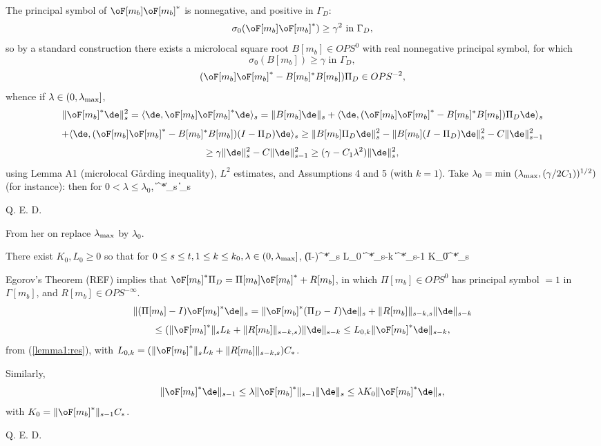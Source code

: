 The principal symbol of $\oF[m_b]\oF[m_b]^*$ is nonnegative, and positive in $\Gamma_D$:
\[
\sigma_0(\oF[m_b]\oF[m_b]^*) \ge \gamma^2 \mbox{ in } \Gamma_D,
\]
so by a standard construction there exists a microlocal square root $B[m_b] \in OPS^0$ with real nonnegative principal symbol, for which 
\[
\sigma_0(B[m_b]) \ge \gamma \mbox{ in } \Gamma_D,
\]
\[
(\oF[m_b]\oF[m_b]^*-B[m_b]^*B[m_b]) \Pi_D \in OPS^{-2},
\]
whence if $\lambda \in (0,\lambda_{\rm max}]$,
\[
\|\oF[m_b]^*\de\|^2_s = \langle \de, \oF[m_b]\oF[m_b]^* \de \rangle_s =
\|B[m_b]\de\|_s+ \langle \de,(\oF[m_b]\oF[m_b]^*-B[m_b]^*B[m_b]) \Pi_D\de
\rangle_s
\]
\[
+ \langle \de,(\oF[m_b]\oF[m_b]^*-B[m_b]^*B[m_b]) (I-\Pi_D)\de \rangle_s \ge
\|B[m_b]\Pi_D\de\|^2_s  -\|B[m_b](I-\Pi_D)\de\|^2_s  - C\|\de\|^2_{s-1}
\]
\[
\ge \gamma \|\de\|^2_s - C\|\de\|^2_{s-1} \ge (\gamma - C_1\lambda^2)\|\de\|^2_s,
\]
using Lemma A1 (microlocal G\aa rding inequality), $L^2$ estimates, and Assumptions 4 and 5 (with $k=1$). Take $\lambda_0 = \mbox{min }(\lambda_{\rm max}, (\gamma/2C_1))^{1/2})$ (for instance): then for $0 < \lambda \le \lambda_0$,
\be
\label{lemma1:eq5}
\|\oF[m_b]^*\de\|_s \ge {} \|\de\|_s
\ee

Q. E. D.

From her on replace $\lambda_{\rm max}$ by $\lambda_0$.

 There exist $K_0, L_0 \ge 0$ so that for $0
\le s \le t, 1 \le k \le k_0, \lambda \in (0, \lambda_{\rm max}]$,
\be
\label{lemma2:res1}
\|(I-\Pi[m_b])\oF[m_b]^*\de\|_s \le L_0 \|\oF[m_b]^*\de\|_{s-k}
\ee
\be
\label{lemma2:res2}
\|\oF[m_b]^*\de\|_{s-1} \le K_0\lambda\|\oF[m_b]^*\de\|_{s}
\ee

Egorov's Theorem (REF) implies that $\oF[m_b]^*\Pi_D = \Pi[m_b]\oF[m_b]^*+R[m_b]$, in which $\Pi[m_b] \in OPS^0$ has principal symbol $=1$ in $\Gamma[m_b]$, and $R[m_b] \in OPS^{-\infty}$.  
\[
\|(\Pi[m_b]-I)\oF[m_b]^*\de\|_s = \|\oF[m_b]^*(\Pi_D-I)\de\|_s + \|R[m_b]\|_{s-k,s}\|\de\|_{s-k}  
\]
\[
\le (\|\oF[m_b]^*\|_{s}L_k+\|R[m_b]\|_{s-k,s})\|\de\|_{s-k} \le L_{0,k}\|\oF[m_b]^*\de\|_{s-k},
\]
from (\ref{lemma1:res}), with $L_{0,k} = (\|\oF[m_b]^*\|_{s}L_k+\|R[m_b]\|_{s-k,s})C_*$.

Similarly,
\[
\|\oF[m_b]^*\de\|_{s-1} \le \lambda\|\oF[m_b]^*\|_{s-1}\|\de\|_{s} \le \lambda K_0\|\oF[m_b]^*\de\|_s,
\]
with $K_0 = \|\oF[m_b]^*\|_{s-1}C_*$.

Q. E. D.

